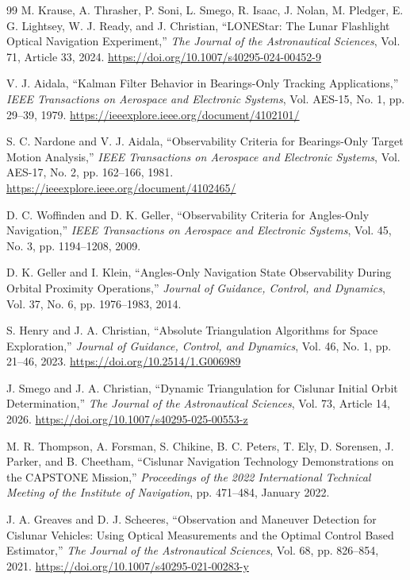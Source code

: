 \documentclass[10pt,twocolumn]{article}
\begin{document}
\begin{thebibliography}{99}
M. Krause, A. Thrasher, P. Soni, L. Smego, R. Isaac, J. Nolan, M. Pledger, E. G. Lightsey, W. J. Ready, and J. Christian, ``LONEStar: The Lunar Flashlight Optical Navigation Experiment,'' \textit{The Journal of the Astronautical Sciences}, Vol. 71, Article 33, 2024. \url{https://doi.org/10.1007/s40295-024-00452-9}

V. J. Aidala, ``Kalman Filter Behavior in Bearings-Only Tracking Applications,'' \textit{IEEE Transactions on Aerospace and Electronic Systems}, Vol. AES-15, No. 1, pp. 29--39, 1979. \url{https://ieeexplore.ieee.org/document/4102101/}

S. C. Nardone and V. J. Aidala, ``Observability Criteria for Bearings-Only Target Motion Analysis,'' \textit{IEEE Transactions on Aerospace and Electronic Systems}, Vol. AES-17, No. 2, pp. 162--166, 1981. \url{https://ieeexplore.ieee.org/document/4102465/}

D. C. Woffinden and D. K. Geller, ``Observability Criteria for Angles-Only Navigation,'' \textit{IEEE Transactions on Aerospace and Electronic Systems}, Vol. 45, No. 3, pp. 1194--1208, 2009.

D. K. Geller and I. Klein, ``Angles-Only Navigation State Observability During Orbital Proximity Operations,'' \textit{Journal of Guidance, Control, and Dynamics}, Vol. 37, No. 6, pp. 1976--1983, 2014.

S. Henry and J. A. Christian, ``Absolute Triangulation Algorithms for Space Exploration,'' \textit{Journal of Guidance, Control, and Dynamics}, Vol. 46, No. 1, pp. 21--46, 2023. \url{https://doi.org/10.2514/1.G006989}

J. Smego and J. A. Christian, ``Dynamic Triangulation for Cislunar Initial Orbit Determination,'' \textit{The Journal of the Astronautical Sciences}, Vol. 73, Article 14, 2026. \url{https://doi.org/10.1007/s40295-025-00553-z}

M. R. Thompson, A. Forsman, S. Chikine, B. C. Peters, T. Ely, D. Sorensen, J. Parker, and B. Cheetham, ``Cislunar Navigation Technology Demonstrations on the CAPSTONE Mission,'' \textit{Proceedings of the 2022 International Technical Meeting of the Institute of Navigation}, pp. 471--484, January 2022.

J. A. Greaves and D. J. Scheeres, ``Observation and Maneuver Detection for Cislunar Vehicles: Using Optical Measurements and the Optimal Control Based Estimator,'' \textit{The Journal of the Astronautical Sciences}, Vol. 68, pp. 826--854, 2021. \url{https://doi.org/10.1007/s40295-021-00283-y}


\end{thebibliography}
\end{document}
